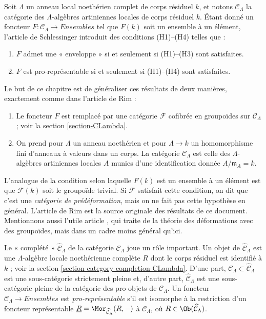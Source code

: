 \medskip\noindent
Soit $\Lambda$ un anneau local noethérien complet de corps résiduel $k$,
et notons $\mathcal{C}_\Lambda$ la catégorie des $\Lambda$-algèbres
artiniennes locales de corps résiduel $k$. Étant donné un foncteur
$F : \mathcal{C}_\Lambda \to \textit{Ensembles}$ tel que $F(k)$
soit un ensemble à un élément, l'article de Schlessinger introduit des
conditions (H1)--(H4) telles que :
\begin{enumerate}
\item $F$ admet une « enveloppe » si et seulement si (H1)--(H3) sont satisfaites.
\item $F$ est pro-représentable si et seulement si (H1)--(H4) sont satisfaites.
\end{enumerate}
Le but de ce chapitre est de généraliser ces résultats de deux manières,
exactement comme dans l'article de Rim :
\begin{enumerate}
\item[(A)] Le foncteur $F$ est remplacé par une catégorie $\mathcal{F}$
cofibrée en groupoïdes sur $\mathcal{C}_\Lambda$ ; voir la
section \ref{section-CLambda}.
\item[(B)] On prend pour $\Lambda$ un anneau noethérien et pour
$\Lambda \to k$ un homomorphisme fini d'anneaux à valeurs dans un corps.
La catégorie $\mathcal{C}_\Lambda$ est celle des $\Lambda$-algèbres
artiniennes locales $A$ munies d'une identification donnée
$A/\mathfrak m_A = k$.
\end{enumerate}
L'analogue de la condition selon laquelle $F(k)$ est un ensemble à un élément
est que $\mathcal{F}(k)$ soit le groupoïde trivial. Si $\mathcal{F}$ satisfait
cette condition, on dit que c'est une {\it catégorie de prédéformation}, mais
on ne fait pas cette hypothèse en général. L'article de Rim
\cite[Exposee VI]{SGA7-I} est la source originale des résultats de ce document.
Mentionnons aussi l'utile article \cite{Talpo-Vistoli}, qui traite de la théorie
des déformations avec des groupoïdes, mais dans un cadre moins général qu'ici.

\medskip\noindent
Le « complété » $\widehat{\mathcal{C}}_\Lambda$ de la catégorie
$\mathcal{C}_\Lambda$ joue un rôle important. Un objet de
$\widehat{\mathcal{C}}_\Lambda$ est une $\Lambda$-algèbre locale
noethérienne complète $R$ dont le corps résiduel est identifié à $k$ ; voir la
section \ref{section-category-completion-CLambda}.
D'une part, $\mathcal{C}_\Lambda \subset \widehat{\mathcal{C}}_\Lambda$
est une sous-catégorie strictement pleine et, d'autre part,
$\widehat{\mathcal{C}}_\Lambda$ est une sous-catégorie pleine de la catégorie
des pro-objets de $\mathcal{C}_\Lambda$. Un foncteur
$\mathcal{C}_\Lambda \to \textit{Ensembles}$ est {\it pro-représentable}
s'il est isomorphe à la restriction d'un foncteur représentable
$\underline{R} = \Mor_{\widehat{\mathcal{C}}_\Lambda}(R, -)$
à $\mathcal{C}_\Lambda$, où
$R \in \Ob(\widehat{\mathcal{C}}_\Lambda)$.

